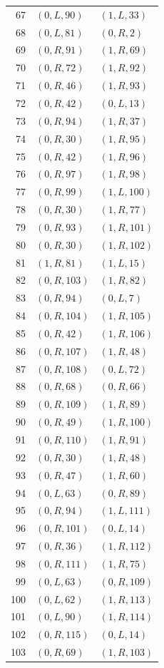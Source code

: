 \begin{longtable}{@{}rll@{}}
67 & $(0,L,90)$ & $(1,L,33)$\\
68 & $(0,L,81)$ & $(0,R,2)$\\
69 & $(0,R,91)$ & $(1,R,69)$\\
70 & $(0,R,72)$ & $(1,R,92)$\\
71 & $(0,R,46)$ & $(1,R,93)$\\
72 & $(0,R,42)$ & $(0,L,13)$\\
73 & $(0,R,94)$ & $(1,R,37)$\\
74 & $(0,R,30)$ & $(1,R,95)$\\
75 & $(0,R,42)$ & $(1,R,96)$\\
76 & $(0,R,97)$ & $(1,R,98)$\\
77 & $(0,R,99)$ & $(1,L,100)$\\
78 & $(0,R,30)$ & $(1,R,77)$\\
79 & $(0,R,93)$ & $(1,R,101)$\\
80 & $(0,R,30)$ & $(1,R,102)$\\
81 & $(1,R,81)$ & $(1,L,15)$\\
82 & $(0,R,103)$ & $(1,R,82)$\\
83 & $(0,R,94)$ & $(0,L,7)$\\
84 & $(0,R,104)$ & $(1,R,105)$\\
85 & $(0,R,42)$ & $(1,R,106)$\\
86 & $(0,R,107)$ & $(1,R,48)$\\
87 & $(0,R,108)$ & $(0,L,72)$\\
88 & $(0,R,68)$ & $(0,R,66)$\\
89 & $(0,R,109)$ & $(1,R,89)$\\
90 & $(0,R,49)$ & $(1,R,100)$\\
91 & $(0,R,110)$ & $(1,R,91)$\\
92 & $(0,R,30)$ & $(1,R,48)$\\
93 & $(0,R,47)$ & $(1,R,60)$\\
94 & $(0,L,63)$ & $(0,R,89)$\\
95 & $(0,R,94)$ & $(1,L,111)$\\
96 & $(0,R,101)$ & $(0,L,14)$\\
97 & $(0,R,36)$ & $(1,R,112)$\\
98 & $(0,R,111)$ & $(1,R,75)$\\
99 & $(0,L,63)$ & $(0,R,109)$\\
100 & $(0,L,62)$ & $(1,R,113)$\\
101 & $(0,L,90)$ & $(1,R,114)$\\
102 & $(0,R,115)$ & $(0,L,14)$\\
103 & $(0,R,69)$ & $(1,R,103)$\\

\end{longtable}
